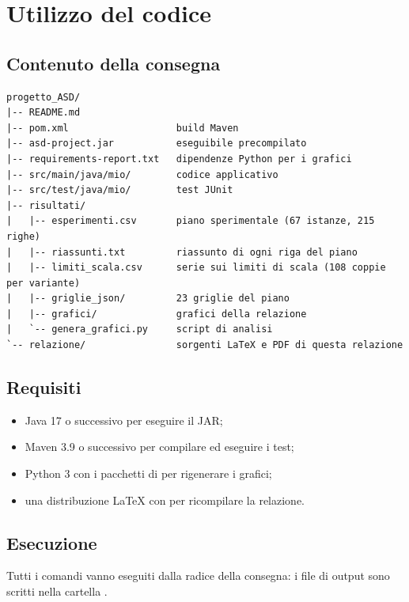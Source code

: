 \section{Utilizzo del codice}
\label{sec:utilizzo}

\subsection{Contenuto della consegna}

\begin{lstlisting}
progetto_ASD/
|-- README.md
|-- pom.xml                   build Maven
|-- asd-project.jar           eseguibile precompilato
|-- requirements-report.txt   dipendenze Python per i grafici
|-- src/main/java/mio/        codice applicativo
|-- src/test/java/mio/        test JUnit
|-- risultati/
|   |-- esperimenti.csv       piano sperimentale (67 istanze, 215 righe)
|   |-- riassunti.txt         riassunto di ogni riga del piano
|   |-- limiti_scala.csv      serie sui limiti di scala (108 coppie per variante)
|   |-- griglie_json/         23 griglie del piano
|   |-- grafici/              grafici della relazione
|   `-- genera_grafici.py     script di analisi
`-- relazione/                sorgenti LaTeX e PDF di questa relazione
\end{lstlisting}

\subsection{Requisiti}

\begin{itemize}
  \item Java 17 o successivo per eseguire il JAR;
  \item Maven 3.9 o successivo per compilare ed eseguire i test;
  \item Python 3 con i pacchetti di  per
        rigenerare i grafici;
  \item una distribuzione \LaTeX{} con  per ricompilare la
        relazione.
\end{itemize}

\subsection{Esecuzione}

Tutti i comandi vanno eseguiti dalla radice della consegna: i file di
output sono scritti nella cartella .

